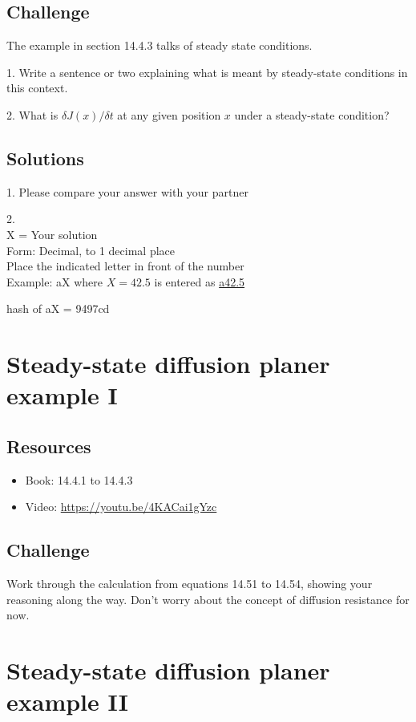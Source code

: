 \subsection*{Challenge}
The example in section 14.4.3 talks of steady state conditions.

1. Write a sentence or two explaining what is meant by steady-state conditions in this context.

2. What is $\delta J(x) / \delta t$ at any given position $x$ under a steady-state condition?

\subsection*{Solutions}
1. Please compare your answer with your partner

2.\\
X = Your solution\\
Form: Decimal, to 1 decimal place\\
Place the indicated letter in front of the number\\
Example: aX where $X=42.5$ is entered as \href{http://www.wolframalpha.com/input/?i=md5+hash+of+\%22a42.5\%22}{a42.5}

hash of aX = 9497cd




\newpage
\section{Steady-state diffusion planer example I}

\subsection*{Resources}
\begin{itemize}
    \item Book: 14.4.1 to 14.4.3
    \item Video: \url{https://youtu.be/4KACai1gYzc}
\end{itemize}

\subsection*{Challenge}
Work through the calculation from equations 14.51 to 14.54, showing your reasoning along the way. Don't worry about the concept of diffusion resistance for now.




\newpage
\section{Steady-state diffusion planer example II}

